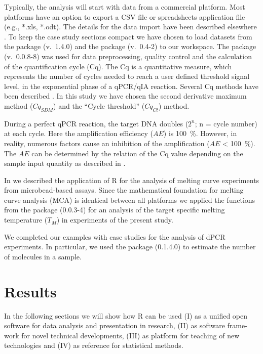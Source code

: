 Typically, the analysis will start with data from a commercial platform. 
Most platforms have an option to export a CSV file or spreadsheets application 
file (e.g., *.xls, *.odt). The details for the data import have been described 
elsewhere \citep{RDCT2010c, rodiger_rkward_2012}. To keep the case study 
sections compact we have chosen to load datasets from the  
package 
\citep{ritz_2008, spiess_2008} (v.~1.4.0) and the  package 
(v.~0.4-2) to our workspace. The  package 
\citep{roediger_2015_Bioinformatics} (v.~0.0.8-8) was used 
for data preprocessing, quality control and  the calculation of the 
quantification cycle (Cq). The Cq is a quantitative measure, which represents 
the number of cycles needed to reach a user defined threshold signal level, in 
the exponential phase of a qPCR/qIA reaction. Several Cq methods have been 
described \citep{ruijter_2013}. In this study we have chosen the second 
derivative maximum method ($Cq_{SDM}$) and the ``Cycle threshold'' ($Cq_{Ct}$) 
method.

During a perfect qPCR reaction, the target DNA doubles ($2^{n}$; n = cycle 
number) at each cycle. Here the amplification efficiency ($AE$) is 100~\%. 
However, in reality, numerous factors cause an inhibition of the amplification 
($AE$ < 100~\%). The $AE$ can be determined by the relation of the Cq value 
depending on the sample input quantity as described in 
\citet{roediger_2015_Bioinformatics, svec_2015}.

In \citet{roediger_RJ_2013} we described the application of R for the analysis 
of melting curve experiments from microbead-based assays. Since the 
mathematical 
foundation for melting curve analysis (MCA) is identical between all platforms 
we applied the functions from the  package (0.0.3-4) for an 
analysis of the target specific melting temperature ($T_{M}$) in experiments of 
the present study.

We completed our examples with case studies for the analysis of dPCR 
experiments. In particular, we used the  package (0.1.4.0) to 
estimate the number of molecules in a sample.

\section{Results}

In the following sections we will show how R can be used (I) as a unified open 
software for data analysis and presentation in research, 
(II) as software frame-work for novel technical developments, (III) as platform 
for teaching of new technologies and (IV) as reference for statistical methods.

